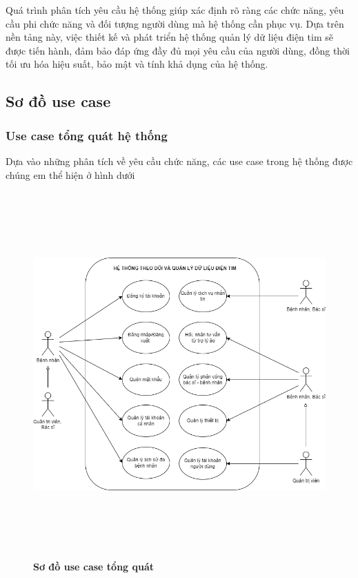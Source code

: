 Quá trình phân tích yêu cầu hệ thống giúp xác định rõ ràng các chức năng, yêu cầu phi chức năng và đối tượng người dùng mà hệ thống cần phục vụ. 
Dựa trên nền tảng này, việc thiết kế và phát triển hệ thống quản lý dữ liệu điện tim sẽ được tiến hành, đảm bảo đáp ứng đầy đủ mọi yêu cầu của người dùng, đồng thời 
tối ưu hóa hiệu suất, bảo mật và tính khả dụng của hệ thống.
\subsection{Sơ đồ use case}
\subsubsection{Use case tổng quát hệ thống}
Dựa vào những phân tích về yêu cầu chức năng, các use case trong hệ thống được chúng em thể hiện ở hình dưới 

  \begin{figure}[H]
    \centering
    \includegraphics[width=16cm,height=14cm]{Images/use_case/use_case_general.png}
    \caption[Sơ đồ use case tổng quát của hệ thống]{\bfseries \fontsize{12pt}{0pt}
    \selectfont Sơ đồ use case tổng quát}
    \label{use_case_general} %
  \end{figure}


